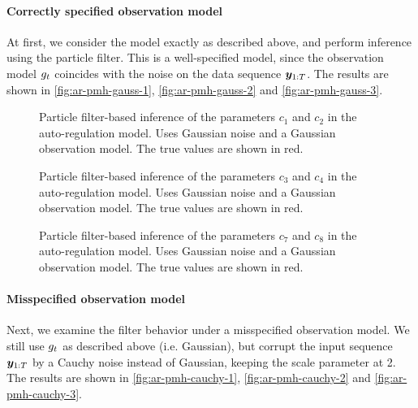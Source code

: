 \paragraph{Correctly specified observation model}
At first, we consider the model exactly as described above, and perform inference using the particle filter. This is a well-specified model, since the observation model $g_t$ coincides with the noise on the data sequence $\bm{y}_{1:T}$. The results are shown in \autoref{fig:ar-pmh-gauss-1}, \autoref{fig:ar-pmh-gauss-2} and \autoref{fig:ar-pmh-gauss-3}.

\begin{figure}[htp]%
    \centering
    \qquad
    \caption{Particle filter-based inference of the parameters $c_1$ and $c_2$ in the auto-regulation model. Uses Gaussian noise and a Gaussian observation model. The true values are shown in red.}%
    \label{fig:ar-pmh-gauss-1}%
\end{figure}

\begin{figure}[htp]%
    \centering
    \qquad
    \caption{Particle filter-based inference of the parameters $c_3$ and $c_4$ in the auto-regulation model. Uses Gaussian noise and a Gaussian observation model. The true values are shown in red.}%
    \label{fig:ar-pmh-gauss-2}%
\end{figure}

\begin{figure}[htp]%
    \centering
    \qquad
    \caption{Particle filter-based inference of the parameters $c_7$ and $c_8$ in the auto-regulation model. Uses Gaussian noise and a Gaussian observation model. The true values are shown in red.}%
    \label{fig:ar-pmh-gauss-3}%
\end{figure}

\paragraph{Misspecified observation model}
Next, we examine the filter behavior under a misspecified observation model. We still use $g_t$ as described above (i.e. Gaussian), but corrupt the input sequence $\bm{y}_{1:T}$ by a Cauchy noise instead of Gaussian, keeping the scale parameter at 2. The results are shown in \autoref{fig:ar-pmh-cauchy-1}, \autoref{fig:ar-pmh-cauchy-2} and \autoref{fig:ar-pmh-cauchy-3}.

